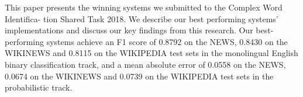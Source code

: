 This paper presents the winning systems we submitted to the Complex Word Identifica- tion Shared Task 2018. We describe our best performing systems' implementations and discuss our key findings from this research. Our best-performing systems achieve an F1 score of 0.8792 on the NEWS, 0.8430 on the WIKINEWS and 0.8115 on the WIKIPEDIA test sets in the monolingual English binary classification track, and a mean absolute error of 0.0558 on the NEWS, 0.0674 on the WIKINEWS and 0.0739 on the WIKIPEDIA test sets in the probabilistic track.
